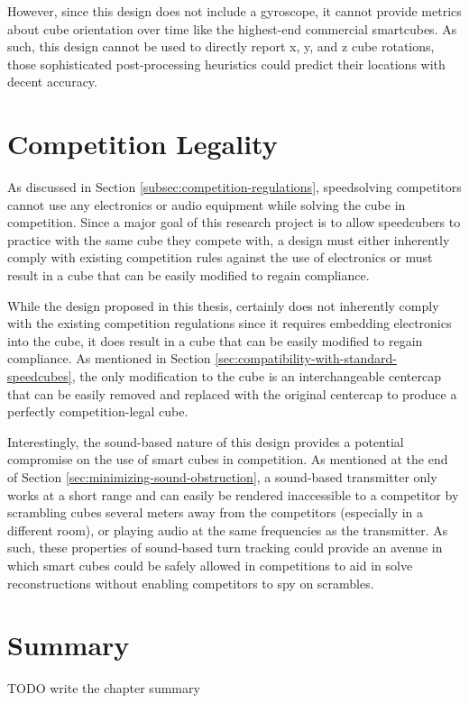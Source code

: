 However, since this design does not include a gyroscope, it cannot
provide metrics about cube orientation over time like the highest-end
commercial smartcubes. As such, this design cannot be used to directly
report x, y, and z cube rotations, those sophisticated post-processing
heuristics could predict their locations with decent accuracy.


\section{Competition Legality}
\label{sec:competition-legality}

As discussed in Section \ref{subsec:competition-regulations},
speedsolving competitors cannot use any electronics or audio equipment
while solving the cube in competition. Since a major goal of this
research project is to allow speedcubers to practice with the same cube
they compete with, a design must either inherently comply with existing
competition rules against the use of electronics or must result in a
cube that can be easily modified to regain compliance.

While the design proposed in this thesis, certainly does not inherently
comply with the existing competition regulations since it requires
embedding electronics into the cube, it does result in a cube that can
be easily modified to regain compliance. As mentioned in Section
\ref{sec:compatibility-with-standard-speedcubes}, the only modification
to the cube is an interchangeable centercap that can be easily removed
and replaced with the original centercap to produce a perfectly
competition-legal cube.

Interestingly, the sound-based nature of this design provides a
potential compromise on the use of smart cubes in competition. As
mentioned at the end of Section \ref{sec:minimizing-sound-obstruction},
a sound-based transmitter only works at a short range and can easily be
rendered inaccessible to a competitor by scrambling cubes several
meters away from the competitors (especially in a different room), or
playing audio at the same frequencies as the transmitter. As such,
these properties of sound-based turn tracking could provide an avenue
in which smart cubes could be safely allowed in competitions to aid in
solve reconstructions without enabling competitors to spy on scrambles.

\section{Summary}
TODO write the chapter summary

